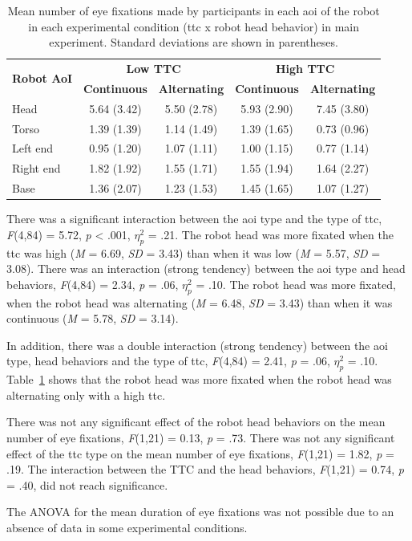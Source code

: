 \documentclass[a4paper,11pt,twoside]{StyleThese}
\begin{document}
\begin{itemize}
\begin{table}[!htbp]
	\centering
    \begin{tabular}{lcccc}
    \hline
    \multirow{2}{*}{\textbf{Robot AoI}} & \multicolumn{2}{c}{\textbf{Low TTC}} & \multicolumn{2}{c}{\textbf{High TTC}} \\
    \cline{2-5} 
               & \textbf{Continuous}  & \textbf{Alternating}  & \textbf{Continuous}  & \textbf{Alternating}   \\
    \hline
    Head       & 5.64 (3.42)  & 5.50 (2.78)  & 5.93 (2.90)  & 7.45 (3.80)   \\
    Torso      & 1.39 (1.39)  & 1.14 (1.49)  & 1.39 (1.65)  & 0.73 (0.96)   \\
    Left end   & 0.95 (1.20)  & 1.07 (1.11)  & 1.00 (1.15)  & 0.77 (1.14)   \\
    Right end  & 1.82 (1.92)  & 1.55 (1.71)  & 1.55 (1.94)  & 1.64 (2.27)   \\
    Base       & 1.36 (2.07)  & 1.23 (1.53)  & 1.45 (1.65)  & 1.07 (1.27)   \\
    \hline
\end{tabular}
   \caption{\label{table:eye_fixation_ttc_head} Mean number of eye fixations made by participants in each \acrfull{aoi} of the robot in each experimental condition (\acrshort{ttc} x robot head behavior) in main experiment. Standard deviations are shown in parentheses.}
\end{table}

There was a significant interaction between the \acrshort{aoi} type and the type of \acrshort{ttc}, \textit{F}(4,84) = 5.72, \textit{p} < .001, $\eta_{p}^{2}$ = .21. The robot head was more fixated when the \acrshort{ttc} was high (\textit{M} = 6.69, \textit{SD} = 3.43) than when it was low (\textit{M} = 5.57, \textit{SD} = 3.08). There was an interaction (strong tendency) between the \acrshort{aoi} type and head behaviors, \textit{F}(4,84) = 2.34, \textit{p} = .06, $\eta_{p}^{2}$ = .10. The robot head was more fixated, when the robot head was alternating  (\textit{M} = 6.48, \textit{SD} = 3.43) than when it was continuous (\textit{M} = 5.78, \textit{SD} = 3.14).

In addition, there was a double interaction (strong tendency) between the \acrshort{aoi} type, head behaviors and the type of \acrshort{ttc}, \textit{F}(4,84) = 2.41, \textit{p} = .06, $\eta_{p}^{2}$ = .10. Table~\ref{table:eye_fixation_ttc_head} shows that the robot head was more fixated when the robot head was alternating only with a high \acrshort{ttc}.

There was not any significant effect of the robot head behaviors on the mean number of eye fixations, \textit{F}(1,21) = 0.13, \textit{p} = .73. There was not any significant effect of the \acrshort{ttc} type on the mean number of eye fixations, \textit{F}(1,21) = 1.82, \textit{p} = .19. The interaction between the TTC and the head behaviors, \textit{F}(1,21) = 0.74, \textit{p} = .40, did not reach significance.

The ANOVA for the mean duration of eye fixations was not possible due to an absence of data in some experimental conditions.
\end{itemize}
\end{document}
